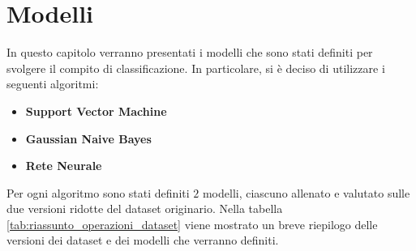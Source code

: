 \chapter{Modelli} \label{ch:modelli}
In questo capitolo verranno presentati i modelli che sono stati definiti
per svolgere il compito di classificazione. In particolare, si è deciso di 
utilizzare i seguenti algoritmi:
\begin{itemize}
    \item \textbf{Support Vector Machine}
    \item \textbf{Gaussian Naive Bayes}
    \item \textbf{Rete Neurale}
\end{itemize}
Per ogni algoritmo sono stati definiti $2$ modelli, ciascuno allenato e valutato
sulle due versioni ridotte del dataset originario. Nella tabella 
\ref{tab:riassunto_operazioni_dataset} viene mostrato un breve riepilogo delle 
versioni dei dataset e dei modelli che verranno definiti.

